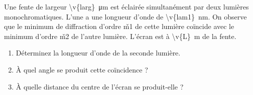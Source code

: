 Une fente de largeur \qty{\v{larg}}{\micro\metre} est éclairée simultanément par deux lumières monochromatiques. L'une a une longueur d'onde de \qty{\v{lam1}}{nm}. On observe que le minimum de diffraction d'ordre \v{m1} de cette lumière coïncide avec le minimum d'ordre \v{m2} de l'autre lumière. L'écran est à \qty{\v{L}}{m} de la fente.

\begin{enumerate}[label=\alph*)]
    \item Déterminez la longueur d'onde de la seconde lumière.
    \item À quel angle se produit cette coïncidence ?
    \item À quelle distance du centre de l'écran se produit-elle ?
\end{enumerate}

